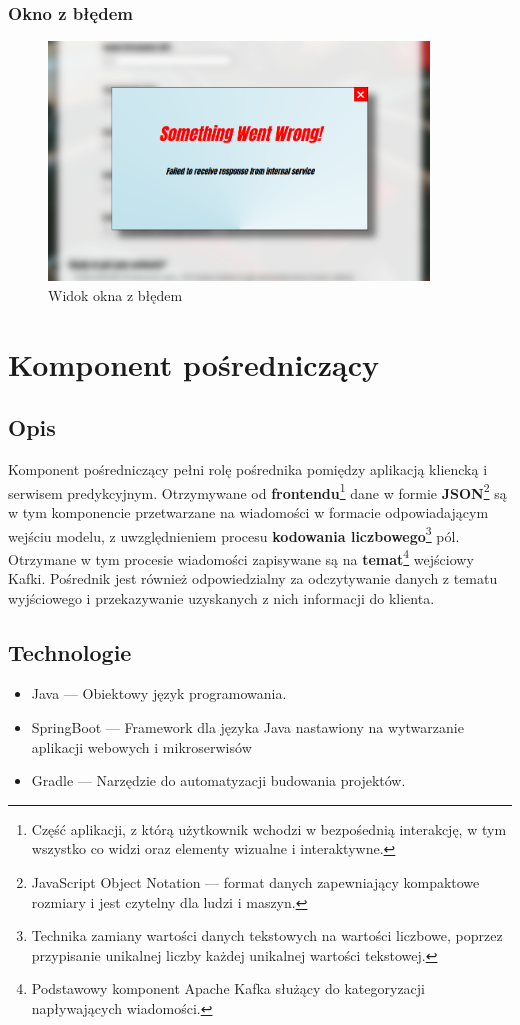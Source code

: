 \documentclass[12pt, a4paper]{report}
\begin{document}
\subsection{Okno z błędem}
\begin{figure}[H]
    \centering
    \includegraphics[width=0.9\textwidth]{images/error_view}
    \caption{Widok okna z błędem}
\end{figure}


\chapter{Komponent pośredniczący}
\section{Opis}
Komponent pośredniczący pełni rolę pośrednika pomiędzy aplikacją kliencką i serwisem predykcyjnym.
Otrzymywane od \textbf{frontendu}\footnote{Część aplikacji, z którą użytkownik wchodzi w bezpośednią interakcję, w tym wszystko co widzi oraz elementy wizualne i interaktywne.}
dane w formie \textbf{JSON}\footnote{JavaScript Object Notation --- format danych zapewniający kompaktowe rozmiary i jest czytelny dla ludzi i maszyn.}
są w tym komponencie przetwarzane na wiadomości w formacie odpowiadającym wejściu modelu, z uwzględnieniem procesu \textbf{kodowania liczbowego}\footnote{
Technika zamiany wartości danych tekstowych na wartości liczbowe, poprzez przypisanie unikalnej liczby każdej unikalnej wartości tekstowej.
} pól. Otrzymane w tym procesie wiadomości zapisywane są na \textbf{temat}\footnote{Podstawowy komponent Apache Kafka służący do kategoryzacji napływających wiadomości.}
 wejściowy Kafki. Pośrednik jest również odpowiedzialny za odczytywanie danych z tematu wyjściowego i
przekazywanie uzyskanych z nich informacji do klienta.
\section{Technologie}
\begin{itemize}
    \item Java --- Obiektowy język programowania.
    \item SpringBoot --- Framework dla języka Java nastawiony na wytwarzanie aplikacji webowych i mikroserwisów
    \item Gradle --- Narzędzie do automatyzacji budowania projektów.
\end{itemize}
\end{document}
